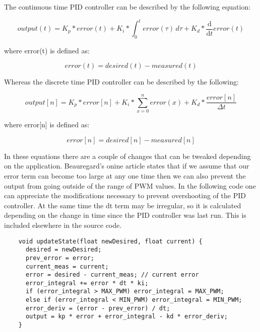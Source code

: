 The continuous time PID controller can be described by the following equation:

\[output(t) = K_p * error(t) + K_i * \int_{0}^{t}error(\tau)\,d\tau + K_d * \frac{\mathrm{d} }{\mathrm{d} t} error(t)\]

where error(t) is defined as:

\[error(t) = desired(t) - measured(t)\]

Whereas the discrete time PID controller can be described by the following:

\[output[n] = K_p * error[n] + K_i * \sum_{x=0}^{n}error(x) + K_d*\frac{error[n]}{\Delta t}\]

where error[n] is defined as:

\[error[n] = desired[n] - measured[n]\]

In these equations there are a couple of changes that can be tweaked depending on the application. Beauregard's onine article \cite{beauregardbrett2011} states that if we assume that our error term can become too large at any one time then we can also prevent the output from going outside of the range of PWM values.  In the following code one can appreciate the modifications necessary to prevent overshooting of the PID controller.  At the same time the dt term may be irregular, so it is calculated depending on the change in time since the PID controller was last run.  This is included elsewhere in the source code.

\begin{lstlisting}
    void updateState(float newDesired, float current) {
      desired = newDesired;
      prev_error = error;
      current_meas = current;
      error = desired - current_meas; // current error
      error_integral += error * dt * ki;
      if (error_integral > MAX_PWM) error_integral = MAX_PWM;
      else if (error_integral < MIN_PWM) error_integral = MIN_PWM;
      error_deriv = (error - prev_error) / dt;
      output = kp * error + error_integral - kd * error_deriv;
    }
\end{lstlisting}